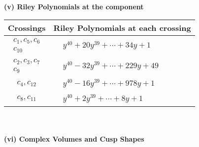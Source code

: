 \documentclass[1p]{elsarticle_modified}
\theoremstyle{definition}
\begin{document}
\newpage\renewcommand{\arraystretch}{1}
\flushleft \textbf{(v) Riley Polynomials at the component}\newline \\
\begin{tabular}{m{50pt}|m{274pt}}
Crossings & \hspace{64pt}Riley Polynomials at each crossing \\
\hline $$\begin{aligned}c_{1},c_{5},c_{6}\\c_{10}\end{aligned}$$&$\begin{aligned}
&y^{40}+20 y^{39}+\cdots+34 y+1
\end{aligned}$\\
\hline $$\begin{aligned}c_{2},c_{3},c_{7}\\c_{9}\end{aligned}$$&$\begin{aligned}
&y^{40}-32 y^{39}+\cdots+229 y+49
\end{aligned}$\\
\hline $$\begin{aligned}c_{4},c_{12}\end{aligned}$$&$\begin{aligned}
&y^{40}-16 y^{39}+\cdots+978 y+1
\end{aligned}$\\
\hline $$\begin{aligned}c_{8},c_{11}\end{aligned}$$&$\begin{aligned}
&y^{40}+2 y^{39}+\cdots+8 y+1
\end{aligned}$\\
\hline
\end{tabular}\\~\\
\newpage\flushleft \textbf{(vi) Complex Volumes and Cusp Shapes}
\end{document}
